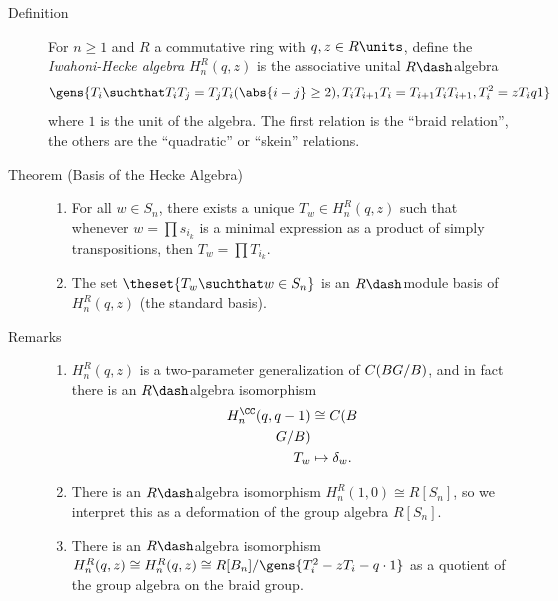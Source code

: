 \begin{description}
\item[Definition]
For \(n\geq 1\) and \(R\) a commutative ring with \(q,z \in R\units\),
define the \emph{Iwahoni-Hecke algebra} \(H_n^R(q, z)\) is the
associative unital \(R\dash\)algebra \begin{align*}
\gens{T_i \suchthat T_i T_j = T_j T_i (\abs{i - j} \geq 2) , T_i T_{i+1} T_i = T_{i+1} T_i T_{i+1}, T_i^2 = zT_i q1}
\end{align*} where \(1\) is the unit of the algebra. The first relation
is the ``braid relation'', the others are the ``quadratic'' or ``skein''
relations.
\item[Theorem (Basis of the Hecke Algebra)]
\hfill

\begin{enumerate}
\def\labelenumi{\arabic{enumi}.}
\tightlist
\item
  For all \(w \in S_n\), there exists a unique \(T_w\in H_n^R(q, z)\)
  such that whenever \(w = \prod s_{i_k}\) is a minimal expression as a
  product of simply transpositions, then \(T_w = \prod T_{i_k}\).
\item
  The set \(\theset {T_w \suchthat w\in S_n}\) is an \(R\dash\)module
  basis of \(H_n^R(q, z)\) (the standard basis).
\end{enumerate}
\item[Remarks]
\hfill

\begin{enumerate}
\def\labelenumi{\arabic{enumi}.}
\item
  \(H_n^R(q, z)\) is a two-parameter generalization of \(C(B\\G/B)\),
  and in fact there is an \(R\dash\)algebra isomorphism \begin{align*}
  H_n^\CC(q, q-1) &\cong C(B\\G/B)\\
  T_w &\mapsto \delta_w
  .\end{align*}
\item
  There is an \(R\dash\)algebra isomorphism
  \(H_n^R(1, 0) \cong R[S_n]\), so we interpret this as a deformation of
  the group algebra \(R[S_n]\).
\item
  There is an \(R\dash\)algebra isomorphism
  \(H_n^R(q, z) \cong H_n^R(q, z) \cong R[B_n] / \gens{T_i^2 - zT_i - q\cdot 1}\)
  as a quotient of the group algebra on the braid group.
\end{enumerate}
\end{description}

